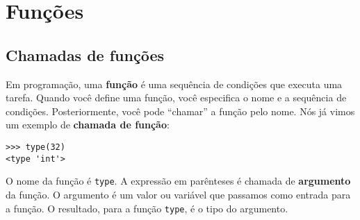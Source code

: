 
\chapter{Funções}
\label{funcchap}

\section{Chamadas de funções}
\label{functionchap}


Em programação, uma {\bf função} é uma sequência de condições que executa uma
tarefa. Quando você define uma função, você especifica o nome e a sequência de
condições. Posteriormente, você pode ``chamar'' a função pelo nome. Nós já
vimos um exemplo de {\bf chamada de função}:

\beforeverb
\begin{verbatim}
>>> type(32)
<type 'int'>
\end{verbatim}
\afterverb
%
%
O nome da função é {\tt type}. A expressão em parênteses é chamada de
{\bf argumento} da função. O argumento é um valor ou variável que passamos
como entrada para a função. O resultado, para a função {\tt type}, é o tipo
do argumento.



